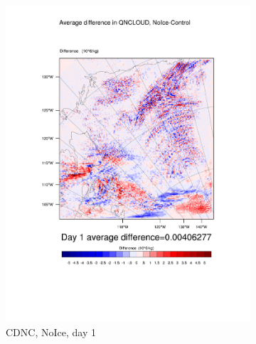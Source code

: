 \begin{figure}[h]
\begin{subfigure}{0.30\textwidth}
		\includegraphics[width=\textwidth]{results/noice/diff_NoIce_QNCLOUD_Day1.pdf}
		\caption{CDNC, NoIce, day 1}
		\label{subfig:CDNCr2Day1}
	\end{subfigure}
	\begin{subfigure}{0.30\textwidth}
		\centering

\end{subfigure}
\end{figure}
